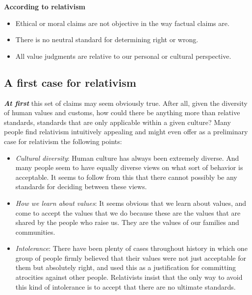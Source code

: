 \documentclass[12pt, openany]{book}
\makeatletter
\providecommand{\tightlist}{%
  \setlength{\itemsep}{0pt}\setlength{\parskip}{0pt}}
\newenvironment{kframe}{%
\medskip{}
\setlength{\fboxsep}{.8em}
 \def\at@end@of@kframe{}%
 \ifinner\ifhmode%
  \def\at@end@of@kframe{\end{minipage}}%
  \begin{minipage}{\columnwidth}%
 \fi\fi%
 \def\FrameCommand##1{\hskip\@totalleftmargin \hskip-\fboxsep
 \colorbox{shadecolor}{##1}\hskip-\fboxsep
     \hskip-\linewidth \hskip-\@totalleftmargin \hskip\columnwidth}%
 \MakeFramed {\advance\hsize-\width
   \@totalleftmargin\z@ \linewidth\hsize
   \@setminipage}}%
 {\par\unskip\endMakeFramed%
 \at@end@of@kframe}
\newenvironment{rmdblock}[1]
  {
  \begin{itemize}
  \renewcommand{\labelitemi}{
    \raisebox{-.7\height}[0pt][0pt]{
      {\setkeys{Gin}{width=3em,keepaspectratio}\texttt{[image: img/\#1]}}
    }
  }
  \setlength{\fboxsep}{1em}
  \begin{kframe}
  \item
  }
  {
  \end{kframe}
  \end{itemize}
  }
\newenvironment{rmdnote}
  {\begin{rmdblock}{note}}
  {\end{rmdblock}}
\makeatother
\begin{document}
\begin{rmdnote}

\textbf{According to relativism}

\begin{itemize}
\tightlist
\item
  Ethical or moral claims are not objective in the way factual claims are.
\item
  There is no neutral standard for determining right or wrong.
\item
  All value judgments are relative to our personal or cultural perspective.
\end{itemize}

\end{rmdnote}

\hypertarget{a-first-case-for-relativism}{%
\subsection*{A first case for relativism}\label{a-first-case-for-relativism}}


\textbf{\emph{At first}} this set of claims may seem obviously true. After all, given the diversity of human values and customs, how could there be anything more than relative standards, standards that are only applicable within a given culture? Many people find relativism intuitively appealing and might even offer as a preliminary case for relativism the following points:

\begin{itemize}
\tightlist
\item
  \emph{Cultural diversity}: Human culture has always been extremely diverse. And many people seem to have equally diverse views on what sort of behavior is acceptable. It seems to follow from this that there cannot possibly be any standards for deciding between these views.
\item
  \emph{How we learn about values}: It seems obvious that we learn about values, and come to accept the values that we do because these are the values that are shared by the people who raise us. They are the values of our families and communities.
\item
  \emph{Intolerance}: There have been plenty of cases throughout history in which one group of people firmly believed that their values were not just acceptable for them but absolutely right, and used this as a justification for committing atrocities against other people. Relativists insist that the only way to avoid this kind of intolerance is to accept that there are no ultimate standards.
\end{itemize}
\end{document}
